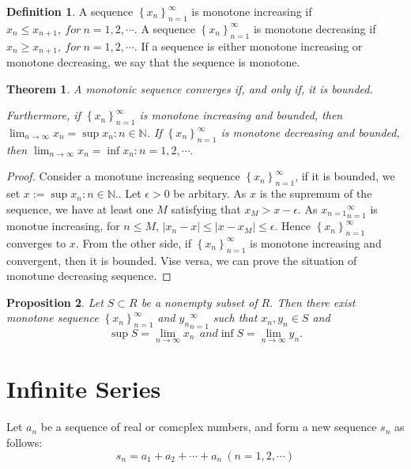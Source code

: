 \documentclass{article}
\newtheorem{theorem}{Theorem}[section]
\newtheorem{prop}[theorem]{Proposition}
\theoremstyle{definition}
\newtheorem{defi}{Definition}[section]
\begin{document}
\begin{defi}
A sequence $\left\{x_{n}\right\}_{n=1}^{\infty}$ is monotone increasing if ${x_{n}\leq x_{n+1}},\ for\ n=1,2,\cdots$.
A sequence $\left\{x_{n}\right\}_{n=1}^{\infty}$ is monotone decreasing if ${x_{n}\geq x_{n+1}},\ for\ n=1,2,\cdots$.
If a sequence is either monotone increasing or monotone decreasing, we say that the sequence is monotone.
\end{defi}

\begin{theorem}
    A monotonic sequence converges if, and only if, it is bounded.

    Furthermore, if $\left\{x_{n}\right\}_{n=1}^{\infty}$ is monotone increasing and bounded, then $\lim_{n\to \infty} x_{n}=\sup{x_{n}:n\in \mathbb{N}}$.
    If $\left\{x_{n}\right\}_{n=1}^{\infty}$ is monotone decreasing and bounded, then $\lim_{n\rightarrow \infty} x_{n}=\inf{x_{n}:n=1,2,\cdots}.$
\end{theorem}


\begin{proof}
Consider a monotune increasing sequence $\left\{x_{n}\right\}_{n=1}^{\infty}$, if it is bounded, we set $x:=\sup{x_{n}:n\in \mathbb{N}}.$. Let $\epsilon>0$ be arbitary. As $x$
is the supremum of the sequence, we have at least one $M$ satisfying that $x_{M}>x-\epsilon.$ As ${x_{n=1}}^{\infty}_{n=1}$ is monotue increasing, for $n\leq M$, $|x_{n}-x|\leq|x-x_{M}|\leq \epsilon.$ 
Hence $\left\{x_{n}\right\}_{n=1}^{\infty}$  converges to $x$. From the other side, if $\left\{x_{n}\right\}_{n=1}^{\infty}$ is monotone increasing and convergent, then it is bounded. Vise versa, we can prove the situation of monotune decreasing sequence.
\end{proof}  

\begin{prop}
    Let $S\subset R$ be a nonempty subset of $R$. Then there exist monotone sequence $\left\{x_{n}\right\}_{n=1}^{\infty}$ and ${y_{n}}_{n=1}^{\infty}$ such that $x_{n},y_{n}\in S$ and
    $$\sup S = \lim_{n\to \infty}x_{n}\ \ and \inf S = \lim_{n\to \infty}y_{n}.$$ 
\end{prop}




\section{Infinite Series}
Let ${a_{n}}$ be a sequence of real or comcplex
numbers, and form a new sequence ${s_{n}}$ as follows:
$$s_{n}=a_{1}+a_{2}+\cdots +a_{n}\ (n=1,2,\cdots)$$
\end{document}
